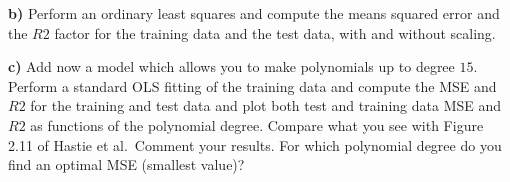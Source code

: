\documentclass{beamer}
\newenvironment{doconceexercise}{}{}
\newcounter{doconce:movie:counter}
\newcommand{\subex}[1]{\noindent\textbf{#1}}  %
\begin{document}
\begin{frame}
\begin{doconceexercise}

\subex{b)}
Perform an ordinary least squares and compute the means squared error and the $R2$ factor for the training data and the test data, with and without scaling.


\subex{c)}
Add now a model which allows you to make polynomials up to degree $15$.  Perform a standard OLS fitting of the training data and compute the MSE and $R2$ for the training and test data and plot both test and training data MSE and $R2$ as functions of the polynomial degree. Compare what you see with Figure 2.11 of Hastie et al.~Comment your results. For which polynomial degree do you find an optimal MSE (smallest value)?


\end{doconceexercise}
\end{frame}
\end{document}
